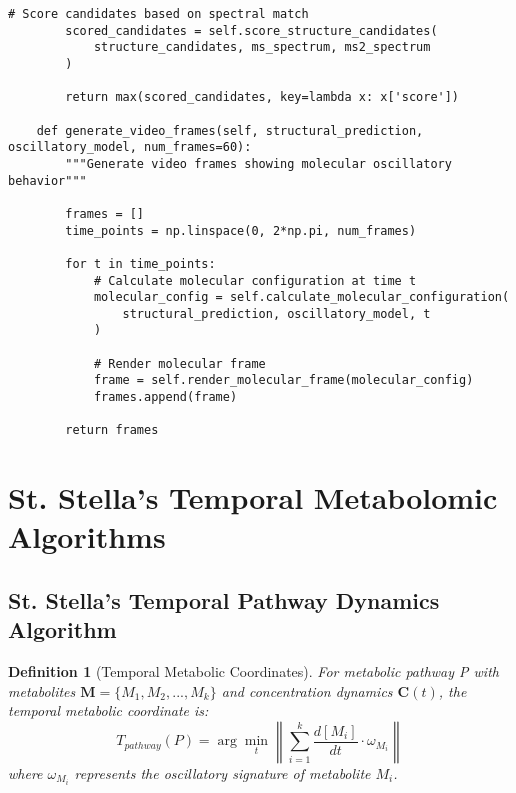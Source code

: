 \documentclass[12pt,a4paper]{article}
\newtheorem{definition}{Definition}
\begin{document}
\begin{lstlisting}[style=pythonstyle, caption=Metabolite Video Reconstruction for Embodied Understanding]
        # Score candidates based on spectral match
        scored_candidates = self.score_structure_candidates(
            structure_candidates, ms_spectrum, ms2_spectrum
        )
        
        return max(scored_candidates, key=lambda x: x['score'])
    
    def generate_video_frames(self, structural_prediction, oscillatory_model, num_frames=60):
        """Generate video frames showing molecular oscillatory behavior"""
        
        frames = []
        time_points = np.linspace(0, 2*np.pi, num_frames)
        
        for t in time_points:
            # Calculate molecular configuration at time t
            molecular_config = self.calculate_molecular_configuration(
                structural_prediction, oscillatory_model, t
            )
            
            # Render molecular frame
            frame = self.render_molecular_frame(molecular_config)
            frames.append(frame)
        
        return frames
\end{lstlisting}

\section{St. Stella's Temporal Metabolomic Algorithms}

\subsection{St. Stella's Temporal Pathway Dynamics Algorithm}

\begin{definition}[Temporal Metabolic Coordinates]
For metabolic pathway P with metabolites $\mathbf{M} = \{M_1, M_2, ..., M_k\}$ and concentration dynamics $\mathbf{C}(t)$, the temporal metabolic coordinate is:
\begin{equation}
T_{pathway}(P) = \arg\min_{t} \left\| \sum_{i=1}^{k} \frac{d[M_i]}{dt} \cdot \omega_{M_i} \right\|
\end{equation}
where $\omega_{M_i}$ represents the oscillatory signature of metabolite $M_i$.
\end{definition}
\end{document}
